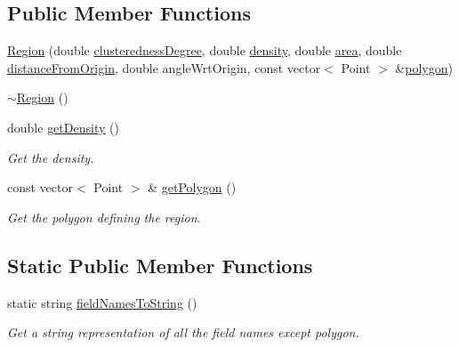 \subsection*{Public Member Functions}
\begin{DoxyCompactItemize}
\item 
\hyperlink{classmultiscale_1_1analysis_1_1Region_a4f4d296d1a4cbeb10690da7af5ba91d2}{Region} (double \hyperlink{classmultiscale_1_1analysis_1_1SpatialCollection2D_acd11d0bbeb60a1168bd2c2fbbc6fe965}{clusteredness\-Degree}, double \hyperlink{classmultiscale_1_1analysis_1_1Region_af4eb62fddbe850271dfe15bb240b13bb}{density}, double \hyperlink{classmultiscale_1_1analysis_1_1SpatialCollection2D_ac570cc755e52aeb9deacf12d223a4a3a}{area}, double \hyperlink{classmultiscale_1_1analysis_1_1SpatialCollection2D_ac2a5d3f8c2cb878c710d821c536b8a4f}{distance\-From\-Origin}, double angle\-Wrt\-Origin, const vector$<$ Point $>$ \&\hyperlink{classmultiscale_1_1analysis_1_1Region_a40d1b47f30bb09c6a47521a968163b6d}{polygon})
\item 
\hyperlink{classmultiscale_1_1analysis_1_1Region_a3c3670fff78f7511d156e3b2f0bc6266}{$\sim$\-Region} ()
\item 
double \hyperlink{classmultiscale_1_1analysis_1_1Region_abe2e6188ff7b749dc2f77169cb75bb95}{get\-Density} ()
\begin{DoxyCompactList}\small\item\em Get the density. \end{DoxyCompactList}\item 
const vector$<$ Point $>$ \& \hyperlink{classmultiscale_1_1analysis_1_1Region_a60e366526dfda2852871c29b70010fb7}{get\-Polygon} ()
\begin{DoxyCompactList}\small\item\em Get the polygon defining the region. \end{DoxyCompactList}\end{DoxyCompactItemize}
\subsection*{Static Public Member Functions}
\begin{DoxyCompactItemize}
\item 
static string \hyperlink{classmultiscale_1_1analysis_1_1Region_af766fd7e5b908bd9cf8c3577271ee65b}{field\-Names\-To\-String} ()
\begin{DoxyCompactList}\small\item\em Get a string representation of all the field names except polygon. \end{DoxyCompactList}\end{DoxyCompactItemize}
